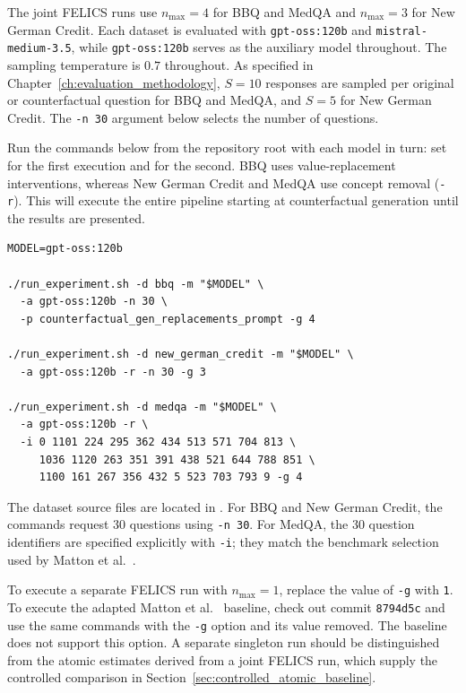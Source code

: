 The joint FELICS runs use $n_{\max}=4$ for BBQ and MedQA and $n_{\max}=3$ for New German Credit. Each dataset is evaluated with \texttt{gpt-oss:120b} and \texttt{mistral-medium-3.5}, while \texttt{gpt-oss:120b} serves as the auxiliary model throughout. The sampling temperature is $0.7$ throughout. As specified in Chapter~\ref{ch:evaluation_methodology}, $S=10$ responses are sampled per original or counterfactual question for BBQ and MedQA, and $S=5$ for New German Credit. The \texttt{-n 30} argument below selects the number of questions.

Run the commands below from the repository root with each model in turn: set  for the first execution and  for the second. BBQ uses value-replacement interventions, whereas New German Credit and MedQA use concept removal (\texttt{-r}). This will execute the entire pipeline starting at counterfactual generation until the results are presented.

\begin{Verbatim}[fontsize=\small,breaklines=true]
MODEL=gpt-oss:120b

./run_experiment.sh -d bbq -m "$MODEL" \
  -a gpt-oss:120b -n 30 \
  -p counterfactual_gen_replacements_prompt -g 4

./run_experiment.sh -d new_german_credit -m "$MODEL" \
  -a gpt-oss:120b -r -n 30 -g 3

./run_experiment.sh -d medqa -m "$MODEL" \
  -a gpt-oss:120b -r \
  -i 0 1101 224 295 362 434 513 571 704 813 \
     1036 1120 263 351 391 438 521 644 788 851 \
     1100 161 267 356 432 5 523 703 793 9 -g 4
\end{Verbatim}

The dataset source files are located in . For BBQ and New German Credit, the commands request 30 questions using \texttt{-n 30}. For MedQA, the 30 question identifiers are specified explicitly with \texttt{-i}; they match the benchmark selection used by Matton et al.~\cite{mattonWalkTalkMeasuring2024}.

To execute a separate FELICS run with $n_{\max}=1$, replace the value of \texttt{-g} with \texttt{1}. To execute the adapted Matton et al.~\cite{mattonWalkTalkMeasuring2024} baseline, check out commit \texttt{8794d5c} and use the same commands with the \texttt{-g} option and its value removed. The baseline does not support this option. A separate singleton run should be distinguished from the atomic estimates derived from a joint FELICS run, which supply the controlled comparison in Section~\ref{sec:controlled_atomic_baseline}.

